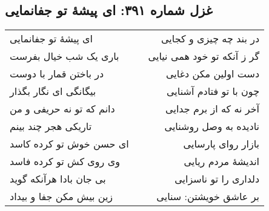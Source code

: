 \begin{center}
\section*{غزل شماره ۳۹۱: ای پیشهٔ تو جفانمایی}
\label{sec:391}
\begin{longtable}{l p{0.5cm} r}
ای پیشهٔ تو جفانمایی
&&
در بند چه چیزی و کجایی
\\
باری یک شب خیال بفرست
&&
گر ز آنکه تو خود همی نیایی
\\
در باختن قمار با دوست
&&
دست اولین مکن دغایی
\\
بیگانگی ای نگار بگذار
&&
چون با تو فتادم آشنایی
\\
دانم که تو نه حریفی و من
&&
آخر نه که از برم جدایی
\\
تاریکی هجر چند بینم
&&
نادیده به وصل روشنایی
\\
ای حسن خوش تو کرده کاسد
&&
بازار روای پارسایی
\\
وی روی کش تو کرده فاسد
&&
اندیشهٔ مردم ریایی
\\
بی جان بادا هرآنکه گوید
&&
دلداری را تو ناسزایی
\\
زین بیش مکن جفا و بیداد
&&
بر عاشق خویشتن: سنایی
\\
\end{longtable}
\end{center}
